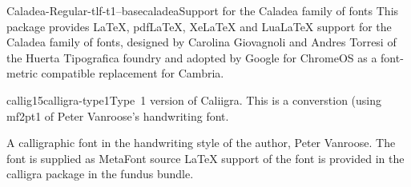\documentclass{ddltxtyp}
\begin{document}

\begin{package}{Caladea-Regular-tlf-t1--base}{caladea}{Support for the Caladea family of fonts}
This package provides LaTeX, pdfLaTeX, XeLaTeX and LuaLaTeX
support for the Caladea family of fonts, designed by Carolina
Giovagnoli and Andres Torresi of the Huerta Tipografica foundry
and adopted by Google for ChromeOS as a font-metric compatible
replacement for Cambria.
\end{package}


\begin{package}{callig15}{calligra-type1}{Type~1 version of Caliigra.}
This is a converstion (using mf2pt1 of Peter Vanroose's
handwriting font.

A calligraphic font in the handwriting style of the author,
Peter Vanroose. The font is supplied as MetaFont source {\LaTeX}
support of the font is provided in the calligra package in the
fundus bundle.
\end{package}
\end{document}
